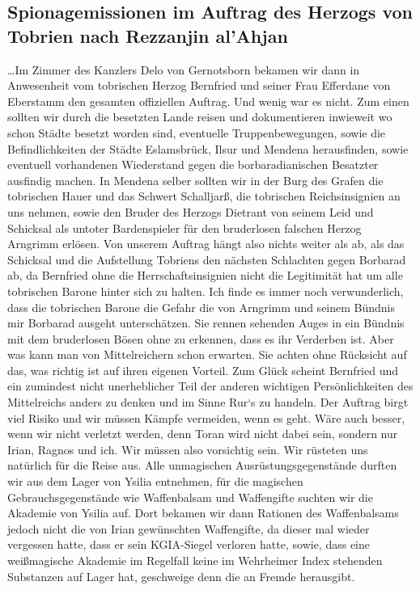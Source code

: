\subsection{Spionagemissionen im Auftrag des Herzogs von Tobrien nach Rezzanjin al'Ahjan}


\dots Im Zimmer des Kanzlers Delo von Gernotsborn bekamen wir dann in Anwesenheit vom tobrischen Herzog Bernfried und seiner Frau Efferdane von Eberstamm den gesamten offiziellen Auftrag. Und wenig war es nicht. Zum einen sollten wir durch die besetzten Lande reisen und dokumentieren inwieweit wo schon Städte besetzt worden sind, eventuelle Truppenbewegungen, sowie die Befindlichkeiten der Städte Eslamsbrück, Ilsur und Mendena herausfinden, sowie eventuell vorhandenen Wiederstand gegen die borbaradianischen Besatzter ausfindig machen. In Mendena selber sollten wir in der Burg des Grafen die tobrischen Hauer und das Schwert Schalljarß, die tobrischen Reichsinsignien an uns nehmen, sowie den Bruder des Herzogs Dietrant von seinem Leid und Schicksal als untoter Bardenspieler für den bruderlosen falschen Herzog Arngrimm erlösen. Von unserem Auftrag hängt also nichts weiter als ab, als das Schicksal und die Aufstellung Tobriens den nächsten Schlachten gegen Borbarad ab, da Bernfried ohne die Herrschaftsinsignien nicht die Legitimität hat um alle tobrischen Barone hinter sich zu halten.
Ich finde es immer noch verwunderlich, dass die tobrischen Barone die Gefahr die von Arngrimm und seinem Bündnis mir Borbarad ausgeht unterschätzen. Sie rennen sehenden Auges in ein Bündnis mit dem bruderlosen Bösen ohne zu erkennen, dass es ihr Verderben ist. Aber was kann man von Mittelreichern schon erwarten. Sie achten ohne Rücksicht auf das, was richtig ist auf ihren eigenen Vorteil. Zum Glück scheint Bernfried und ein zumindest nicht unerheblicher Teil der anderen wichtigen Persönlichkeiten des Mittelreichs anders zu denken und im Sinne Rur‘s zu handeln.
Der Auftrag birgt viel Risiko und wir müssen Kämpfe vermeiden, wenn es geht. Wäre auch besser, wenn wir nicht verletzt werden, denn Toran wird nicht dabei sein, sondern nur Irian, Ragnos und ich. Wir müssen also vorsichtig sein.
Wir rüsteten uns natürlich für die Reise aus. Alle unmagischen Ausrüstungsgegenstände durften wir aus dem Lager von Ysilia entnehmen, für die magischen Gebrauchsgegenstände wie Waffenbalsam und Waffengifte suchten wir die Akademie von Ysilia auf. Dort bekamen wir dann Rationen des Waffenbalsams jedoch nicht die von Irian gewünschten Waffengifte, da dieser mal wieder vergessen hatte, dass er sein KGIA-Siegel verloren hatte, sowie, dass eine weißmagische Akademie im Regelfall keine im Wehrheimer Index stehenden Substanzen auf Lager hat, geschweige denn die an Fremde herausgibt.

